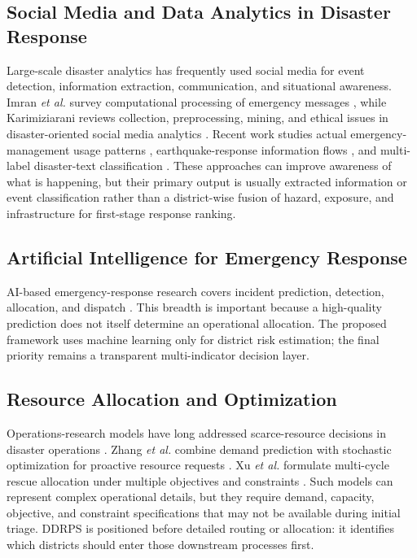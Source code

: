 \documentclass[conference]{IEEEtran}
\begin{document}
\subsection{Social Media and Data Analytics in Disaster Response}
Large-scale disaster analytics has frequently used social media for event
detection, information extraction, communication, and situational awareness.
Imran \emph{et al.} survey computational processing of emergency messages
\cite{imran}, while Karimiziarani reviews collection, preprocessing, mining,
and ethical issues in disaster-oriented social media analytics
\cite{karimiziarani}. Recent work studies actual emergency-management usage
patterns \cite{purohit}, earthquake-response information flows
\cite{kopanov}, and multi-label disaster-text classification
\cite{crisissense}. These approaches can improve awareness of what is
happening, but their primary output is usually extracted information or event
classification rather than a district-wise fusion of hazard, exposure, and
infrastructure for first-stage response ranking.

\subsection{Artificial Intelligence for Emergency Response}
AI-based emergency-response research covers incident prediction, detection,
allocation, and dispatch \cite{mukhopadhyay}. This breadth is important because
a high-quality prediction does not itself determine an operational allocation.
The proposed framework uses machine learning only for district risk estimation;
the final priority remains a transparent multi-indicator decision layer.

\subsection{Resource Allocation and Optimization}
Operations-research models have long addressed scarce-resource decisions in
disaster operations \cite{altay}. Zhang \emph{et al.} combine demand
prediction with stochastic optimization for proactive resource requests
\cite{zhang}. Xu \emph{et al.} formulate multi-cycle rescue allocation under
multiple objectives and constraints \cite{xu}. Such models can represent
complex operational details, but they require demand, capacity, objective, and
constraint specifications that may not be available during initial triage.
DDRPS is positioned before detailed routing or allocation: it identifies which
districts should enter those downstream processes first.
\end{document}
